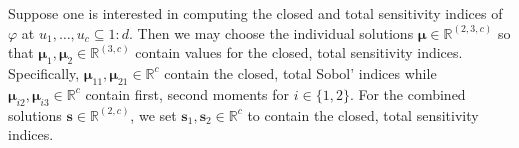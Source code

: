 \documentclass[graybox]{svmult}
\begin{document}
Suppose one is interested in computing the closed and total sensitivity indices of $\varphi$ at $u_1,\dots,u_c \subseteq 1:d$. Then we may choose the individual solutions $\boldsymbol{\mu} \in \mathbb{R}^{(2, 3, c)}$ so that
$\boldsymbol{\mu}_1,\boldsymbol{\mu}_2 \in \mathbb{R}^{(3,c)}$ contain values for the closed, total sensitivity indices. Specifically,  $\boldsymbol{\mu}_{11},\boldsymbol{\mu}_{21} \in \mathbb{R}^c$ contain the closed, total Sobol' indices while $\boldsymbol{\mu}_{i2}, \boldsymbol{\mu}_{i3} \in \mathbb{R}^c$ contain first, second moments for $i \in \{1,2\}$. For the combined solutions $\boldsymbol{s} \in \mathbb{R}^{(2, c)}$, we set $\boldsymbol{s}_1, \boldsymbol{s}_2 \in \mathbb{R}^c$ to contain the closed, total sensitivity indices. 
\end{document}

